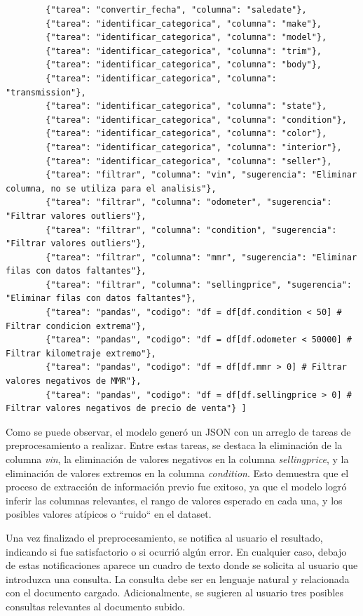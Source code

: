 \begin{lstlisting}
		{"tarea": "convertir_fecha", "columna": "saledate"}, 
		{"tarea": "identificar_categorica", "columna": "make"}, 
		{"tarea": "identificar_categorica", "columna": "model"}, 
		{"tarea": "identificar_categorica", "columna": "trim"}, 
		{"tarea": "identificar_categorica", "columna": "body"}, 
		{"tarea": "identificar_categorica", "columna": "transmission"}, 
		{"tarea": "identificar_categorica", "columna": "state"}, 
		{"tarea": "identificar_categorica", "columna": "condition"}, 
		{"tarea": "identificar_categorica", "columna": "color"}, 
		{"tarea": "identificar_categorica", "columna": "interior"}, 
		{"tarea": "identificar_categorica", "columna": "seller"}, 
		{"tarea": "filtrar", "columna": "vin", "sugerencia": "Eliminar columna, no se utiliza para el analisis"}, 
		{"tarea": "filtrar", "columna": "odometer", "sugerencia": "Filtrar valores outliers"}, 
		{"tarea": "filtrar", "columna": "condition", "sugerencia": "Filtrar valores outliers"}, 
		{"tarea": "filtrar", "columna": "mmr", "sugerencia": "Eliminar filas con datos faltantes"}, 
		{"tarea": "filtrar", "columna": "sellingprice", "sugerencia": "Eliminar filas con datos faltantes"}, 
		{"tarea": "pandas", "codigo": "df = df[df.condition < 50] # Filtrar condicion extrema"}, 
		{"tarea": "pandas", "codigo": "df = df[df.odometer < 50000] # Filtrar kilometraje extremo"}, 
		{"tarea": "pandas", "codigo": "df = df[df.mmr > 0] # Filtrar valores negativos de MMR"}, 
		{"tarea": "pandas", "codigo": "df = df[df.sellingprice > 0] # Filtrar valores negativos de precio de venta"} ]
\end{lstlisting}

Como se puede observar, el modelo generó un JSON con un arreglo de tareas de preprocesamiento a realizar.  Entre estas tareas, se destaca la eliminación de la columna \textit{vin}, la eliminación de valores negativos en la columna \textit{sellingprice}, y la eliminación de valores extremos en la columna \textit{condition}.  Esto demuestra que el proceso de extracción de información previo fue exitoso, ya que el modelo logró inferir las columnas relevantes, el rango de valores esperado en cada una, y los posibles valores atípicos o ``ruido`` en el dataset.

Una vez finalizado el preprocesamiento, se notifica al usuario el resultado, indicando si fue satisfactorio o si ocurrió algún error. En cualquier caso, debajo de estas notificaciones aparece un cuadro de texto donde se solicita al usuario que introduzca una consulta. La consulta debe ser en lenguaje natural y relacionada con el documento cargado. Adicionalmente, se sugieren al usuario tres posibles consultas relevantes al documento subido.

